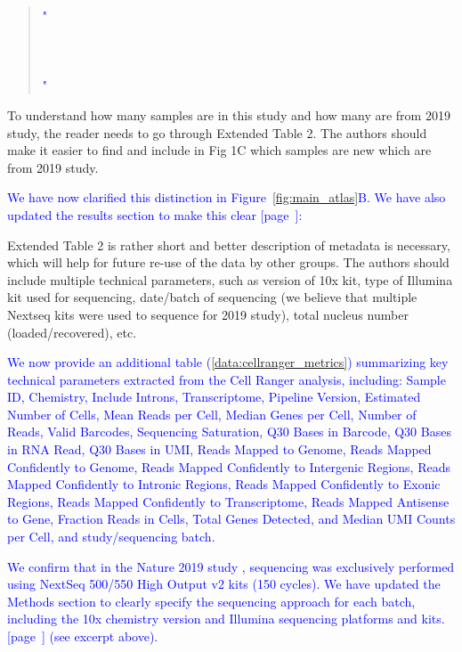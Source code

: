 \begin{quote}
	\textcolor{blue}{"\quoteJ\\ \\
	\quoteK\\ \\
	\quoteL"}
\end{quote}


To understand how many samples are in this study and how many are from 2019 study, the reader needs to go through Extended Table 2. The authors should make it easier to find and include in Fig 1C which samples are new which are from 2019 study.

\textcolor{blue}{We have now clarified this distinction in Figure~\ref{fig:main_atlas}B. We have also updated the results section to make this clear [page~\pageref{quoteE-label}]:}

\begin{quote}
	\quoteE
\end{quote}

Extended Table 2 is rather short and better description of metadata is necessary, which will help for future re-use of the data by other groups. The authors should include multiple technical parameters, such as version of 10x kit, type of Illumina kit used for sequencing, date/batch of sequencing (we believe that multiple Nextseq kits were used to sequence for 2019 study), total nucleus number (loaded/recovered), etc.

\textcolor{blue}{We now provide an additional table (\ref{data:cellranger_metrics}) summarizing key technical parameters extracted from the Cell Ranger analysis, including: Sample ID, Chemistry, Include Introns, Transcriptome, Pipeline Version, Estimated Number of Cells, Mean Reads per Cell, Median Genes per Cell, Number of Reads, Valid Barcodes, Sequencing Saturation, Q30 Bases in Barcode, Q30 Bases in RNA Read, Q30 Bases in UMI, Reads Mapped to Genome, Reads Mapped Confidently to Genome, Reads Mapped Confidently to Intergenic Regions, Reads Mapped Confidently to Intronic Regions, Reads Mapped Confidently to Exonic Regions, Reads Mapped Confidently to Transcriptome, Reads Mapped Antisense to Gene, Fraction Reads in Cells, Total Genes Detected, and Median UMI Counts per Cell, and study/sequencing batch.}

\textcolor{blue}{We confirm that in the Nature 2019 study \cite{Mathys2019-dl}, sequencing was exclusively performed using NextSeq 500/550 High Output v2 kits (150 cycles). We have updated the Methods section to clearly specify the sequencing approach for each batch, including the 10x chemistry version and Illumina sequencing platforms and kits. [page~\pageref{quoteJ-label}] (see excerpt above).}


